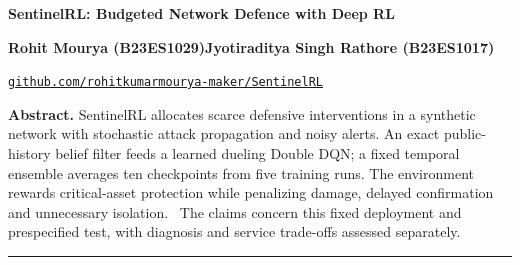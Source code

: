 \documentclass[10pt,a4paper]{article}
\begin{document}
\begin{center}
{\Large\bfseries SentinelRL: Budgeted Network Defence with Deep RL}\par\vspace{4pt}
{\small\textbf{Rohit Mourya (B23ES1029)}\quad\textbf{Jyotiraditya Singh Rathore (B23ES1017)}}\par
{\small\href{https://github.com/rohitkumarmourya-maker/SentinelRL}{\texttt{github.com/rohitkumarmourya-maker/SentinelRL}}}\par
\end{center}
\small\textbf{Abstract.} SentinelRL allocates scarce defensive interventions in a synthetic network with stochastic attack propagation and noisy alerts. An exact public-history belief filter feeds a learned dueling Double DQN; a fixed temporal ensemble averages ten checkpoints from five training runs. The environment rewards critical-asset protection while penalizing damage, delayed confirmation and unnecessary isolation. \AbstractResult\ The claims concern this fixed deployment and prespecified test, with diagnosis and service trade-offs assessed separately.
\vspace{4pt}\hrule\vspace{3pt}
\end{document}
